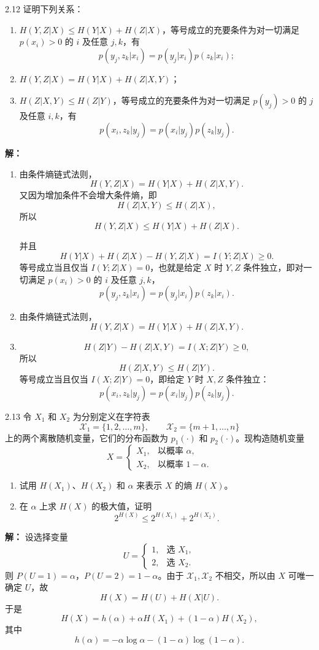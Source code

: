 \documentclass[UTF8,11pt,a4paper]{ctexart}
\begin{document}
\begin{problem}{2.12}
证明下列关系：
\begin{enumerate}[label=\textnormal{(\alph*)}]
  \item $H(Y,Z|X)\le H(Y|X)+H(Z|X)$，等号成立的充要条件为对一切满足 $p(x_i)>0$ 的 $i$ 及任意 $j,k$，有
  \[
  p(y_j,z_k|x_i)=p(y_j|x_i)p(z_k|x_i);
  \]
  \item $H(Y,Z|X)=H(Y|X)+H(Z|X,Y)$；
  \item $H(Z|X,Y)\le H(Z|Y)$，等号成立的充要条件为对一切满足 $p(y_j)>0$ 的 $j$ 及任意 $i,k$，有
  \[
  p(x_i,z_k|y_j)=p(x_i|y_j)p(z_k|y_j).
  \]
\end{enumerate}
\end{problem}
\noindent\textbf{解：}
\begin{enumerate}[label=\textnormal{(\alph*)}]
  \item 由条件熵链式法则，
  \[
  H(Y,Z|X)=H(Y|X)+H(Z|X,Y).
  \]
  又因为增加条件不会增大条件熵，即
  \[
  H(Z|X,Y)\le H(Z|X),
  \]
  所以
  \[
  H(Y,Z|X)\le H(Y|X)+H(Z|X).
  \]

  并且
  \[
  H(Y|X)+H(Z|X)-H(Y,Z|X)=I(Y;Z|X)\ge 0.
  \]
  等号成立当且仅当 $I(Y;Z|X)=0$，也就是给定 $X$ 时 $Y,Z$ 条件独立，即对一切满足 $p(x_i)>0$ 的 $i$ 及任意 $j,k$，
  \[
  p(y_j,z_k|x_i)=p(y_j|x_i)p(z_k|x_i).
  \]

  \item 由条件熵链式法则，
  \[
  H(Y,Z|X)=H(Y|X)+H(Z|X,Y).
  \]

  \item
  \[
  H(Z|Y)-H(Z|X,Y)=I(X;Z|Y)\ge 0,
  \]
  所以
  \[
  H(Z|X,Y)\le H(Z|Y).
  \]
  等号成立当且仅当 $I(X;Z|Y)=0$，即给定 $Y$ 时 $X,Z$ 条件独立：
  \[
  p(x_i,z_k|y_j)=p(x_i|y_j)p(z_k|y_j).
  \]
\end{enumerate}
\vspace{0.8em}

\begin{problem}{2.13}
令 $X_1$ 和 $X_2$ 为分别定义在字符表
\[
\mathscr{X}_1=\{1,2,\dots,m\},\qquad
\mathscr{X}_2=\{m+1,\dots,n\}
\]
上的两个离散随机变量，它们的分布函数为 $p_1(\cdot)$ 和 $p_2(\cdot)$。现构造随机变量
\[
X=
\begin{cases}
X_1, & \text{以概率 }\alpha,\\
X_2, & \text{以概率 }1-\alpha.
\end{cases}
\]
\begin{enumerate}[label=\textnormal{(\alph*)}]
  \item 试用 $H(X_1)$、$H(X_2)$ 和 $\alpha$ 来表示 $X$ 的熵 $H(X)$。
  \item 在 $\alpha$ 上求 $H(X)$ 的极大值，证明
\[
2^{H(X)}\le 2^{H(X_1)}+2^{H(X_2)}.
\]
\end{enumerate}
\end{problem}
\noindent\textbf{解：}
设选择变量
\[
U=
\begin{cases}
1, & \text{选 }X_1,\\
2, & \text{选 }X_2.
\end{cases}
\]
则 $P(U=1)=\alpha$，$P(U=2)=1-\alpha$。由于 $\mathscr{X}_1,\mathscr{X}_2$ 不相交，所以由 $X$ 可唯一确定 $U$，故
\[
H(X)=H(U)+H(X|U).
\]
于是
\[
H(X)=h(\alpha)+\alpha H(X_1)+(1-\alpha)H(X_2),
\]
其中
\[
h(\alpha)=-\alpha\log\alpha-(1-\alpha)\log(1-\alpha).
\]
\end{document}
